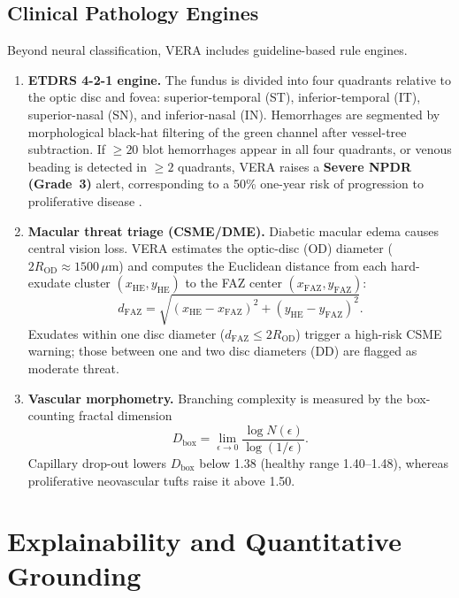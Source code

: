 \documentclass[conference]{IEEEtran}
\begin{document}
\subsection{Clinical Pathology Engines}
Beyond neural classification, VERA includes guideline-based rule engines.
\begin{enumerate}
\item \textbf{ETDRS 4-2-1 engine.} The fundus is divided into four quadrants relative to the optic disc and fovea: superior-temporal (ST), inferior-temporal (IT), superior-nasal (SN), and inferior-nasal (IN). Hemorrhages are segmented by morphological black-hat filtering of the green channel after vessel-tree subtraction. If $\ge20$ blot hemorrhages appear in all four quadrants, or venous beading is detected in $\ge2$ quadrants, VERA raises a \textbf{Severe NPDR (Grade~3)} alert, corresponding to a 50\% one-year risk of progression to proliferative disease \cite{wilkinson2003}.
\item \textbf{Macular threat triage (CSME/DME).} Diabetic macular edema causes central vision loss. VERA estimates the optic-disc (OD) diameter ($2R_{\mathrm{OD}}\approx1500\,\mu$m) and computes the Euclidean distance from each hard-exudate cluster $(x_{\mathrm{HE}},y_{\mathrm{HE}})$ to the FAZ center $(x_{\mathrm{FAZ}},y_{\mathrm{FAZ}})$:
\begin{equation}
d_{\mathrm{FAZ}}=\sqrt{(x_{\mathrm{HE}}-x_{\mathrm{FAZ}})^2+(y_{\mathrm{HE}}-y_{\mathrm{FAZ}})^2}.
\end{equation}
Exudates within one disc diameter ($d_{\mathrm{FAZ}}\le2R_{\mathrm{OD}}$) trigger a high-risk CSME warning; those between one and two disc diameters (DD) are flagged as moderate threat.
\item \textbf{Vascular morphometry.} Branching complexity is measured by the box-counting fractal dimension
\begin{equation}
D_{\mathrm{box}}=\lim_{\epsilon\to0}\frac{\log N(\epsilon)}{\log(1/\epsilon)}.
\end{equation}
Capillary drop-out lowers $D_{\mathrm{box}}$ below 1.38 (healthy range 1.40--1.48), whereas proliferative neovascular tufts raise it above 1.50.
\end{enumerate}

\section{Explainability and Quantitative Grounding}
\end{document}
